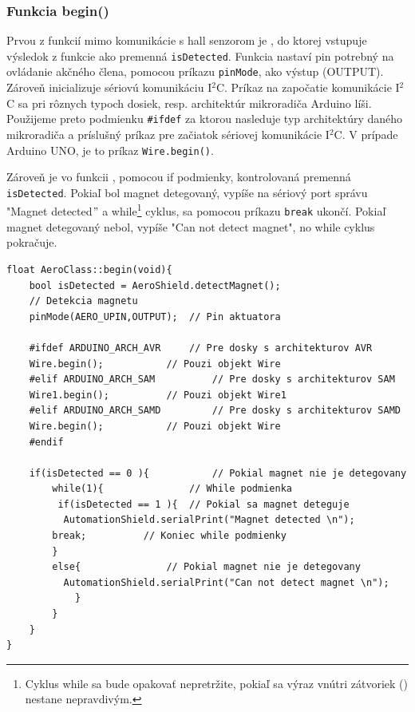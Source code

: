 \subsubsection{Funkcia begin()}

Prvou z funkcií mimo komunikácie s hall senzorom je , do ktorej vstupuje výsledok z funkcie  ako premenná \verb|isDetected|. Funkcia  nastaví pin potrebný na ovládanie akčného člena, pomocou príkazu \verb|pinMode|, ako výstup (OUTPUT). Zároveň inicializuje sériovú komunikáciu I$^{2}$C. Príkaz na započatie komunikácie I$^{2}$C sa pri rôznych typoch dosiek, resp. architektúr mikroradiča Arduino líši. Použijeme preto podmienku \verb|#ifdef| za ktorou nasleduje typ architektúry daného mikroradiča a príslušný príkaz pre začiatok sériovej komunikácie I$^{2}$C. V prípade Arduino UNO, je to príkaz \verb|Wire.begin()|. 

Zároveň je vo funkcii , pomocou if podmienky, kontrolovaná premenná \verb|isDetected|. Pokiaľ bol magnet detegovaný, vypíše na sériový port správu "Magnet detected$"$ a while\footnote[8]{Cyklus while sa bude opakovať nepretržite, pokiaľ sa výraz vnútri zátvoriek () nestane nepravdivým.} cyklus, sa pomocou príkazu \verb|break| ukončí. Pokiaľ magnet detegovaný nebol, vypíše "Can not detect magnet", no while cyklus pokračuje.  


\begin{lstlisting}[caption={Zdrojový kód funkcie begin.},captionpos=b]
float AeroClass::begin(void){                       
	bool isDetected = AeroShield.detectMagnet(); 
	// Detekcia magnetu 
	pinMode(AERO_UPIN,OUTPUT);	// Pin aktuatora
	
	#ifdef ARDUINO_ARCH_AVR		// Pre dosky s architekturov AVR
	Wire.begin();			// Pouzi objekt Wire
	#elif ARDUINO_ARCH_SAM      	// Pre dosky s architekturov SAM
	Wire1.begin();			// Pouzi objekt Wire1
	#elif ARDUINO_ARCH_SAMD     	// Pre dosky s architekturov SAMD
	Wire.begin();			// Pouzi objekt Wire
	#endif
	
	if(isDetected == 0 ){       	// Pokial magnet nie je detegovany
		while(1){               // While podmienka
		 if(isDetected == 1 ){	// Pokial sa magnet deteguje
		  AutomationShield.serialPrint("Magnet detected \n");	
		break;		    // Koniec while podmienky
		}
		else{               // Pokial magnet nie je detegovany
		  AutomationShield.serialPrint("Can not detect magnet \n");
			}
		}
	}       
} 
\end{lstlisting}

